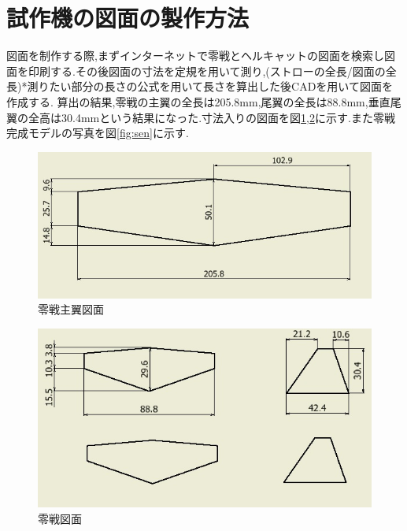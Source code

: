 \section{試作機の図面の製作方法}
図面を制作する際,まずインターネットで零戦とヘルキャットの図面を検索し図面を印刷する.その後図面の寸法を定規を用いて測り,(ストローの全長/図面の全長)*測りたい部分の長さの公式を用いて長さを算出した後CADを用いて図面を作成する.
算出の結果,零戦の主翼の全長は205.8mm,尾翼の全長は88.8mm,垂直尾翼の全高は30.4mmという結果になった.寸法入りの図面を図\ref{fig:mainwing},\ref{fig:tail}に示す.また零戦完成モデルの写真を図\ref{fig:sen}に示す.

\begin{figure}[htbp]
  \begin{center}
    \includegraphics[width=140mm]{mainwing.JPG}
    \end{center}
  \caption{零戦主翼図面}
 \label{fig:mainwing}
\end{figure}

\begin{figure}[htbp]
  \begin{center}
    \includegraphics[width=140mm]{tail.JPG}
    \end{center}
  \caption{零戦図面}
 \label{fig:tail}
\end{figure}

